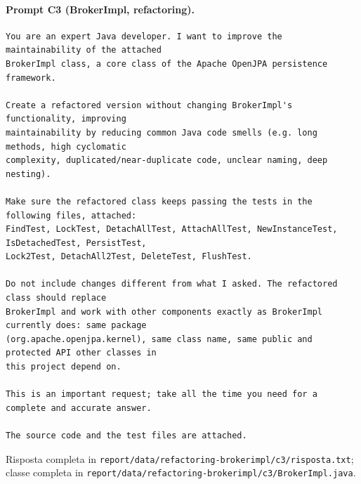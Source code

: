 \paragraph*{Prompt C3 (BrokerImpl, refactoring).}
\label{prompt:refactor-c3}
\begin{lstlisting}
You are an expert Java developer. I want to improve the maintainability of the attached
BrokerImpl class, a core class of the Apache OpenJPA persistence framework.

Create a refactored version without changing BrokerImpl's functionality, improving
maintainability by reducing common Java code smells (e.g. long methods, high cyclomatic
complexity, duplicated/near-duplicate code, unclear naming, deep nesting).

Make sure the refactored class keeps passing the tests in the following files, attached:
FindTest, LockTest, DetachAllTest, AttachAllTest, NewInstanceTest, IsDetachedTest, PersistTest,
Lock2Test, DetachAll2Test, DeleteTest, FlushTest.

Do not include changes different from what I asked. The refactored class should replace
BrokerImpl and work with other components exactly as BrokerImpl currently does: same package
(org.apache.openjpa.kernel), same class name, same public and protected API other classes in
this project depend on.

This is an important request; take all the time you need for a complete and accurate answer.

The source code and the test files are attached.
\end{lstlisting}
Risposta completa in \texttt{report/data/refactoring-brokerimpl/c3/risposta.txt}; classe
completa in \texttt{report/data/refactoring-brokerimpl/c3/BrokerImpl.java}.

